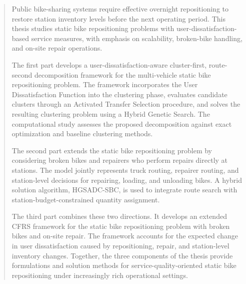 \begin{abstract}
Public bike-sharing systems require effective overnight repositioning to restore station inventory levels before the next operating period. This thesis studies static bike repositioning problems with user-dissatisfaction-based service measures, with emphasis on scalability, broken-bike handling, and on-site repair operations.

The first part develops a user-dissatisfaction-aware cluster-first, route-second decomposition framework for the multi-vehicle static bike repositioning problem. The framework incorporates the User Dissatisfaction Function into the clustering phase, evaluates candidate clusters through an Activated Transfer Selection procedure, and solves the resulting clustering problem using a Hybrid Genetic Search. The computational study assesses the proposed decomposition against exact optimization and baseline clustering methods.

The second part extends the static bike repositioning problem by considering broken bikes and repairers who perform repairs directly at stations. The model jointly represents truck routing, repairer routing, and station-level decisions for repairing, loading, and unloading bikes. A hybrid solution algorithm, HGSADC-SBC, is used to integrate route search with station-budget-constrained quantity assignment.

The third part combines these two directions. It develops an extended CFRS framework for the static bike repositioning problem with broken bikes and on-site repair. The framework accounts for the expected change in user dissatisfaction caused by repositioning, repair, and station-level inventory changes. Together, the three components of the thesis provide formulations and solution methods for service-quality-oriented static bike repositioning under increasingly rich operational settings.
\end{abstract}
